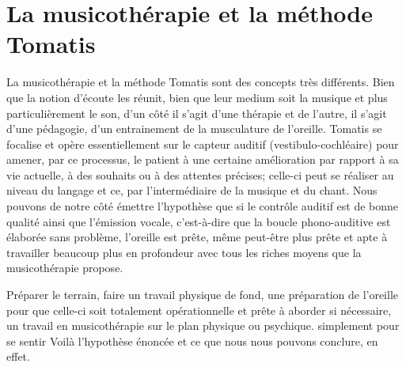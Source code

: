 \section{La musicothérapie et la méthode Tomatis}

La musicothérapie et la méthode Tomatis sont des concepts très différents. Bien que la notion d'écoute les réunit, bien que leur medium soit la musique et plus particulièrement le son, d'un côté il s'agit d'une thérapie et de l'autre, il s'agit d'une pédagogie, d'un entrainement de la musculature de l'oreille. 
Tomatis se focalise et opère essentiellement sur le capteur auditif (vestibulo-cochléaire) pour amener, par ce processus, le patient à une certaine  amélioration par rapport à sa vie actuelle, à des souhaits ou à des attentes précises; celle-ci peut se réaliser au niveau du langage et ce, par l'intermédiaire de la musique et du chant. Nous pouvons de notre côté  émettre l'hypothèse que si le contrôle auditif est de bonne qualité ainsi que l'émission vocale, c'est-à-dire que la boucle phono-auditive est élaborée sans problème, l'oreille est prête, même peut-être plus prête et apte à travailler beaucoup plus en profondeur avec tous les riches moyens que la musicothérapie propose.


Préparer le terrain, faire un travail physique de fond, une préparation de l'oreille pour que celle-ci soit totalement opérationnelle et prête à aborder si nécessaire, un travail en musicothérapie sur le plan physique ou psychique. simplement pour se sentir 
Voilà l'hypothèse énoncée et ce que nous nous pouvons conclure, en effet.
